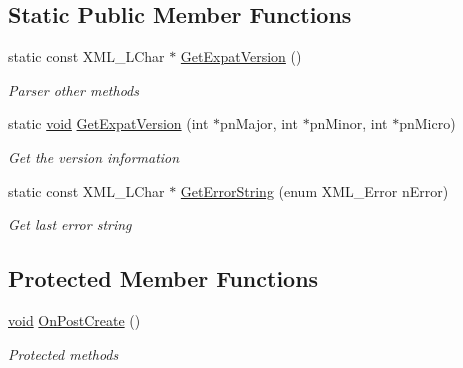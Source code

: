 \subsection*{\-Static \-Public \-Member \-Functions}
\begin{DoxyCompactItemize}
\item 
static const \-X\-M\-L\-\_\-\-L\-Char $\ast$ \hyperlink{class_c_expat_impl_aad3b5874db5b019fcd5fb370bb585463}{\-Get\-Expat\-Version} ()
\begin{DoxyCompactList}\small\item\em \-Parser other methods \end{DoxyCompactList}\item 
static \hyperlink{_cpclient_8h_a6464f7480a0fd0ee170cba12b2c0497f}{void} \hyperlink{class_c_expat_impl_ac6bd3e8292fecc53dfd04038f851eb97}{\-Get\-Expat\-Version} (int $\ast$pn\-Major, int $\ast$pn\-Minor, int $\ast$pn\-Micro)
\begin{DoxyCompactList}\small\item\em \-Get the version information \end{DoxyCompactList}\item 
static const \-X\-M\-L\-\_\-\-L\-Char $\ast$ \hyperlink{class_c_expat_impl_a1e549012634630c0dc954cd6f15f25e5}{\-Get\-Error\-String} (enum \-X\-M\-L\-\_\-\-Error n\-Error)
\begin{DoxyCompactList}\small\item\em \-Get last error string \end{DoxyCompactList}\end{DoxyCompactItemize}
\subsection*{\-Protected \-Member \-Functions}
\begin{DoxyCompactItemize}
\item 
\hyperlink{_cpclient_8h_a6464f7480a0fd0ee170cba12b2c0497f}{void} \hyperlink{class_c_expat_impl_a348eb163ca08ff99195a91e50c27ee2c}{\-On\-Post\-Create} ()
\begin{DoxyCompactList}\small\item\em \-Protected methods \end{DoxyCompactList}\end{DoxyCompactItemize}
